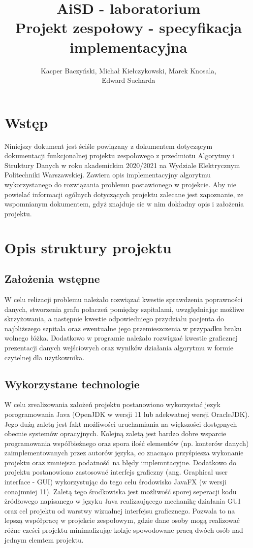 \documentclass[10pt,a4paper]{article}
\title{\huge AiSD - laboratorium \\ \Large Projekt zespołowy - specyfikacja implementacyjna}
\author{Kacper Baczyński, Michał Kiełczykowski, Marek Knosala, \\ Edward Sucharda}
\begin{document}
\maketitle

\section{Wstęp}

Niniejszy dokument jest ściśle powiązany z dokumentem dotyczącym dokumentacji funkcjonalnej projektu zespołowego z przedmiotu Algorytmy i Struktury Danych w roku akademickim 2020/2021 na Wydziale Elektrycznym Politechniki Warszawskiej.
Zawiera opis implementacyjny algorytmu wykorzystanego do rozwiązania problemu postawionego w projekcie.
Aby nie powielać informacji ogólnych dotyczących projektu zalecane jest zapoznanie, ze wspomnianym dokumentem, gdyż znajduje sie w nim dokładny opis i założenia projektu.

\section{Opis struktury projektu}

\subsection{Założenia wstępne}


W celu relizacji problemu należało rozwiązać kwestie sprawdzenia poprawności danych, stworzenia grafu połaczeń pomiędzy szpitalami, uwzględniając możliwe skrzyżowania, a następnie kwestie odpowiedniego przydziału pacjenta do najbliższego
szpitala oraz ewentualne jego przemieszczenia w przypadku braku wolnego łóżka.
Dodatkowo w programie należało rozwiązać kwestie graficznej prezentacji danych wejściowych oraz wyników działania algorytmu w formie czytelnej dla użytkownika.

\subsection{Wykorzystane technologie}

W celu zrealizowania założeń projektu postanowiono wykorzystać jezyk porogramowania Java (OpenJDK w wersji 11 lub adekwatnej wersji OracleJDK).
Jego dużą zaletą jest fakt możliwości uruchamiania na większości dostępnych obecnie systemów opracyjnych.
Kolejną zaletą jest bardzo dobre wsparcie programowania współbieżnego oraz spora ilość elementów (np. konterów danych) zaimplementowanych przez autorów języka, co znacząco przyśpiesza wykonanie projektu oraz zmniejsza podatność na błędy implemntacyjne.
Dodatkowo do projektu postanowiono zastosować interfejs graficzny (ang. Graphical user interface - GUI) wykorzystując do tego celu środowisko JavaFX (w wersji conajmniej 11).
Zaletą tego środkowiska jest możliwość sporej seperacji kodu żródłowego napisanego w języku Java realizaującego mechanikę działania GUI oraz cel projektu od warstwy wizualnej interfejsu graficznego.
Pozwala to na lepszą współpracę w projekcie zespołowym, gdzie dane osoby mogą realizować różne cześci projektu minimalizując kolzje spowodowane pracą dwóch osób nad jednym elemtem projektu.
\end{document}
